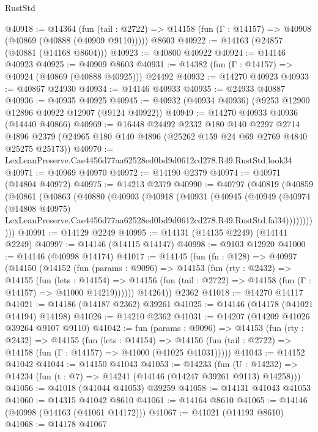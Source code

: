 \begin{lexlean}{RustStd}
\begin{coremodule}
@40918 := @14364
    (fun (tail : @2722) => @14158 (fun (Γ : @14157) => @40908 (@40869 (@40888 (@40909 @9110)))))
    @8603
@40922 := @14163 (@24857 (@40881 (@14168 @8604)))
@40923 := @40800 @40922
@40924 := @14146 @40923
@40925 := @40909 @8603
@40931 := @14382 (fun (Γ : @14157) => @40924 (@40869 (@40888 @40925))) @24492
@40932 := @14270 @40923
@40933 := @40867 @24930
@40934 := @14146 @40933
@40935 := @24933 @40887
@40936 := @40935 @40925
@40945 := @40932 (@40934 @40936) (@9253 @12900 @12896 @40922 @12907 (@9124 @40922))
@40949 := @14270 @40933 @40936 (@14440 @40866)
@40969 := @16448
    @24492
    @2332
    @180
    @140
    @2297
    @2714
    @4896
    @2379
    (@24965 @180 @140 @4896 (@25262 @159 @24 @69 @2769 @4840 @25275 @25173))
@40970 := LexLeanPreserve.Cae4456d77aa62528ed0bd9d0612cd278.R49.RustStd.look34
@40971 := @40969 @40970
@40972 := @14190 @2379
@40974 := @40971 (@14804 @40972)
@40975 := @14213 @2379
@40990 := @40797
    (@40819
      (@40859
        (@40861
          (@40863
            (@40880
              (@40903
                (@40918
                  (@40931
                    (@40945
                      (@40949
                        (@40974
                          (@14808 @40975)
                          LexLeanPreserve.Cae4456d77aa62528ed0bd9d0612cd278.R49.RustStd.fal34)))))))))))
@40991 := @14129 @2249
@40995 := @14131 (@14135 @2249) (@14141 @2249)
@40997 := @14146 (@14115 @14147)
@40998 := @9103 @12920
@41000 := @14146 (@40998 @14174)
@41017 := @14145
    (fun (fn : @128) =>
    @40997
      (@14150
        (@14152
          (fun (params : @9096) =>
          @14153
            (fun (rty : @2432) =>
            @14155
              (fun (lets : @14154) =>
              @14156 (fun (tail : @2722) => @14158 (fun (Γ : @14157) => @41000 @14219))))))
        @14264))
    @2362
@41018 := @14270 @14117
@41021 := @14186 (@14187 @2362) @39261
@41025 := @14146 (@14178 (@41021 @14194) @14198)
@41026 := @14210 @2362
@41031 := @14207 (@14209 @41026 @39264 @9107 @9110)
@41042 := fun (params : @9096) =>
  @14153
    (fun (rty : @2432) =>
    @14155
      (fun (lets : @14154) =>
      @14156 (fun (tail : @2722) => @14158 (fun (Γ : @14157) => @41000 (@41025 @41031)))))
@41043 := @14152 @41042
@41044 := @14150 @41043
@41053 := @14233
    (fun (U : @14232) => @14234 (fun (t : @7) => @14241 (@14146 (@14247 @39261 @9113) @14258)))
@41056 := @41018 (@41044 @41053) @39259
@41058 := @14131 @41043 @41053
@41060 := @14315 @41042 @8610
@41061 := @14164 @8610
@41065 := @14146 (@40998 (@14163 (@41061 @14172)))
@41067 := @41021 (@14193 @8610)
@41068 := @14178 @41067

\end{coremodule}
\end{lexlean}
